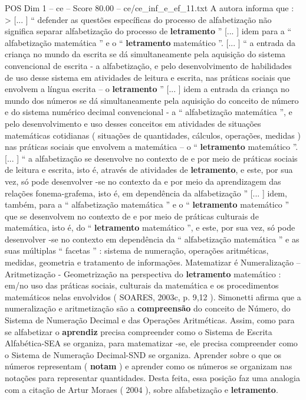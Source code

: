 \begin{textsample}{POS Dim 1 – ce – Score 80.00 – ce/ce\_inf\_e\_ef\_11.txt}
A autora informa que : > [... ] “ defender as questões específicas do processo de alfabetização não significa separar alfabetização do processo de \textbf{letramento} ” [... ] idem para a “ alfabetização matemática ” e o “ \textbf{letramento} matemático ”. [... ] “ a entrada da criança no mundo da escrita se dá simultaneamente pela aquisição do sistema convencional de escrita - a alfabetização, e pelo desenvolvimento de habilidades de uso desse sistema em atividades de leitura e escrita, nas práticas sociais que envolvem a língua escrita – o \textbf{letramento} ” [... ] idem a entrada da criança no mundo dos números se dá simultaneamente pela aquisição do conceito de número e do sistema numérico decimal convencional - a “ alfabetização matemática ”, e pelo desenvolvimento e uso desses conceitos em atividades de situações matemáticas cotidianas ( situações de quantidades, cálculos, operações, medidas ) nas práticas sociais que envolvem a matemática – o “ \textbf{letramento} matemático ”. [... ] “ a alfabetização se desenvolve no contexto de e por meio de práticas sociais de leitura e escrita, isto é, através de atividades de \textbf{letramento}, e este, por sua vez, só pode desenvolver -se no contexto da e por meio da aprendizagem das relações fonema-grafema, isto é, em dependência da alfabetização ” [... ] idem, também, para a “ alfabetização matemática ” e o “ \textbf{letramento} matemático ” que se desenvolvem no contexto de e por meio de práticas culturais de matemática, isto é, do “ \textbf{letramento} matemático ”, e este, por sua vez, só pode desenvolver -se no contexto em dependência da “ alfabetização matemática ” e as suas múltiplas “ facetas ” : sistema de numeração, operações aritméticas, medidas, geometria e tratamento de informações.
Matematizar é Numeralização – Aritmetização - Geometrização na perspectiva do \textbf{letramento} matemático : em/no uso das práticas sociais, culturais da matemática e os procedimentos matemáticos nelas envolvidos ( SOARES, 2003c, p. 9,12 ).
Simonetti afirma que a numeralização e aritmetização são a \textbf{compreensão} do conceito de Número, do Sistema de Numeração Decimal e das Operações Aritméticas.
Assim, como para se alfabetizar o \textbf{aprendiz} precisa compreender como o Sistema de Escrita Alfabética-SEA se organiza, para matematizar -se, ele precisa compreender como o Sistema de Numeração Decimal-SND se organiza.
Aprender sobre o que os números representam ( \textbf{notam} ) e aprender como os números se organizam nas notações para representar quantidades.
Desta feita, essa posição faz uma analogia com a citação de Artur Moraes ( 2004 ), sobre alfabetização e \textbf{letramento}.

\end{textsample}
